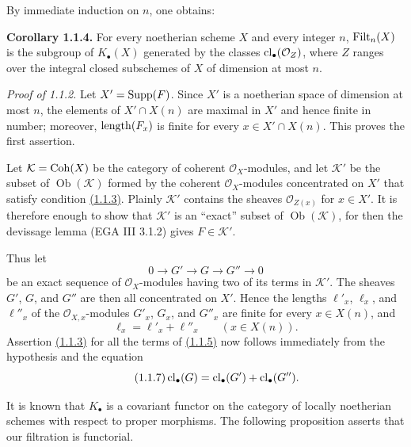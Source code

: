 By immediate induction on $n$, one obtains:

\textbf{Corollary 1.1.4.}
For every noetherian scheme $X$ and every integer $n$, $\operatorname{Filt}_n(X)$ is the
subgroup of $K_\bullet(X)$ generated by the classes
$\operatorname{cl}_\bullet(\mathcal O_Z)$, where $Z$ ranges over the integral closed
subschemes of $X$ of dimension at most $n$.

\emph{Proof of 1.1.2.}
Let $X'=\operatorname{Supp}(F)$. Since $X'$ is a noetherian space of dimension at most $n$,
the elements of $X'\cap X(n)$ are maximal in $X'$ and hence finite in number;
moreover, $\operatorname{length}(F_x)$ is finite for every $x\in X'\cap X(n)$. This proves
the first assertion.

Let $\mathcal K=\operatorname{Coh}(X)$ be the category of coherent $\mathcal O_X$-modules,
and let $\mathcal K'$ be the subset of $\operatorname{Ob}(\mathcal K)$ formed
by the coherent $\mathcal O_X$-modules concentrated on $X'$ that satisfy
condition \hyperlink{sga6.e10.eq.1-1-3}{(1.1.3)}. Plainly $\mathcal K'$ contains the sheaves
$\mathcal O_{Z(x)}$ for $x\in X'$. It is therefore enough to show that
$\mathcal K'$ is an ``exact'' subset of $\operatorname{Ob}(\mathcal K)$,
for then the devissage lemma (EGA III 3.1.2) gives $F\in\mathcal K'$.

Thus let
\begin{equation}\tag{1.1.5}
0\longrightarrow G'\longrightarrow G\longrightarrow G''\longrightarrow0
\end{equation}
be an exact sequence of $\mathcal O_X$-modules having two of its terms in
$\mathcal K'$. The sheaves $G'$, $G$, and $G''$ are then all concentrated on
$X'$. Hence the lengths $\ell'_x$, $\ell_x$, and $\ell''_x$ of the
$\mathcal O_{X,x}$-modules $G'_x$, $G_x$, and $G''_x$ are finite for every
$x\in X(n)$, and
\begin{equation}\tag{1.1.6}
\ell_x=\ell'_x+\ell''_x\qquad(x\in X(n)).
\end{equation}
Assertion \hyperlink{sga6.e10.eq.1-1-3}{(1.1.3)} for all the terms of \hyperlink{sga6.e10.eq.1-1-5}{(1.1.5)} now follows immediately from
the hypothesis and the equation
\begin{equation}\tag{1.1.7}
\operatorname{cl}_\bullet(G)=\operatorname{cl}_\bullet(G')+\operatorname{cl}_\bullet(G'').
\end{equation}

It is known that $K_\bullet$ is a covariant functor on the category of locally
noetherian schemes with respect to proper morphisms. The following proposition
asserts that our filtration is functorial.

